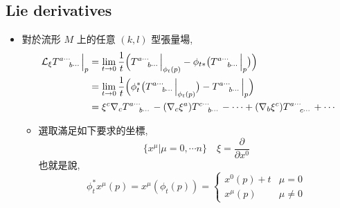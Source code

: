 \subsection{Lie derivatives}
\begin{itemize}
	\item 對於流形 $M$ 上的任意 $(k , l)$ 型張量場,
	\begin{align}
		\mathcal{L}_\xi \tensor{T}{^{a \cdots}_{b \cdots}} \Big|_p &= \lim_{t \rightarrow 0} \frac{1}{t} \Big( \tensor{T}{^{a \cdots}_{b \cdots}} \Big|_{\phi_t(p)} - \phi_{t *} \big( \tensor{T}{^{a \cdots}_{b \cdots}} \Big|_p \big) \Big) \\
		&= \lim_{t \rightarrow 0} \frac{1}{t} \Big( \phi^*_t \big( \tensor{T}{^{a \cdots}_{b \cdots}} \Big|_{\phi_t(p)} \big) - \tensor{T}{^{a \cdots}_{b \cdots}} \Big|_p \Big) \\
		&= \xi^c \nabla_c \tensor{T}{^{a \cdots}_{b \cdots}} - (\nabla_c \xi^a) \tensor{T}{^{c \cdots}_{b \cdots}} - \cdots + (\nabla_b \xi^c) \tensor{T}{^{a \cdots}_{c \cdots}} + \cdots
	\end{align}
	
	\begin{tcolorbox}[title=proof:]
		\begin{itemize}
			\item 選取滿足如下要求的坐標,
			\begin{equation}
				\{ x^\mu | \mu = 0,\cdots n \} \quad \xi = \frac{\partial}{\partial x^0}
			\end{equation}
			也就是說,
			\begin{equation}
				\phi^*_t x^\mu(p) = x^\mu(\phi_t(p)) = \begin{cases}
					x^0(p) + t & \mu = 0 \\
					x^\mu(p) & \mu \neq 0
				\end{cases}
			\end{equation}
			

\end{itemize}
\end{tcolorbox}
\end{itemize}
